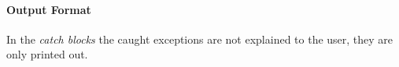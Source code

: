 


\paragraph{Output Format}
\begin{itemize}
		In the \textit{catch blocks} the caught exceptions are not explained to the user, they are only printed out.
		\begin{itemize}
		\end{itemize}
\end{itemize}

